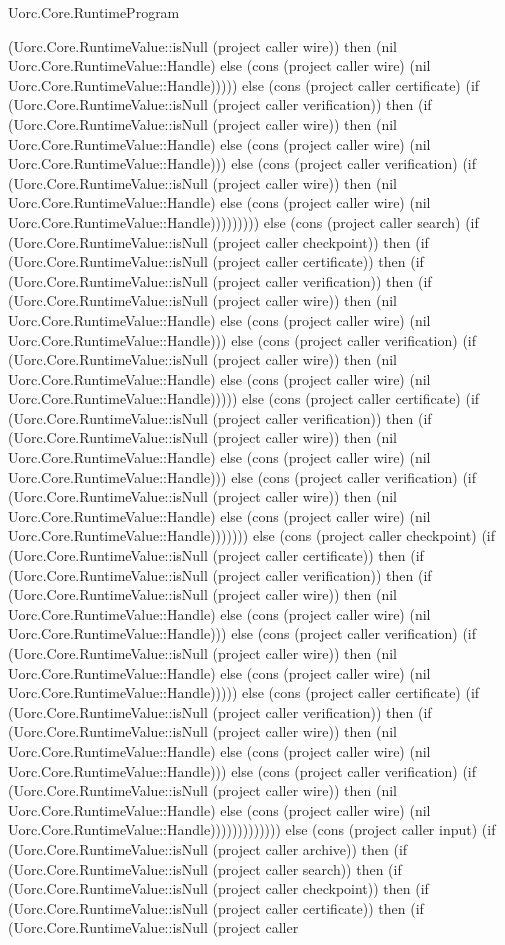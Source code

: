 \begin{lexlean}{Uorc.Core.RuntimeProgram}
\begin{semanticmodule}
{(Uorc.Core.RuntimeValue::isNull (project caller wire)) then (nil Uorc.Core.RuntimeValue::Handle) else (cons (project caller wire) (nil Uorc.Core.RuntimeValue::Handle))))) else (cons (project caller certificate) (if (Uorc.Core.RuntimeValue::isNull (project caller verification)) then (if (Uorc.Core.RuntimeValue::isNull (project caller wire)) then (nil Uorc.Core.RuntimeValue::Handle) else (cons (project caller wire) (nil Uorc.Core.RuntimeValue::Handle))) else (cons (project caller verification) (if (Uorc.Core.RuntimeValue::isNull (project caller wire)) then (nil Uorc.Core.RuntimeValue::Handle) else (cons (project caller wire) (nil Uorc.Core.RuntimeValue::Handle))))))))) else (cons (project caller search) (if (Uorc.Core.RuntimeValue::isNull (project caller checkpoint)) then (if (Uorc.Core.RuntimeValue::isNull (project caller certificate)) then (if (Uorc.Core.RuntimeValue::isNull (project caller verification)) then (if (Uorc.Core.RuntimeValue::isNull (project caller wire)) then (nil Uorc.Core.RuntimeValue::Handle) else (cons (project caller wire) (nil Uorc.Core.RuntimeValue::Handle))) else (cons (project caller verification) (if (Uorc.Core.RuntimeValue::isNull (project caller wire)) then (nil Uorc.Core.RuntimeValue::Handle) else (cons (project caller wire) (nil Uorc.Core.RuntimeValue::Handle))))) else (cons (project caller certificate) (if (Uorc.Core.RuntimeValue::isNull (project caller verification)) then (if (Uorc.Core.RuntimeValue::isNull (project caller wire)) then (nil Uorc.Core.RuntimeValue::Handle) else (cons (project caller wire) (nil Uorc.Core.RuntimeValue::Handle))) else (cons (project caller verification) (if (Uorc.Core.RuntimeValue::isNull (project caller wire)) then (nil Uorc.Core.RuntimeValue::Handle) else (cons (project caller wire) (nil Uorc.Core.RuntimeValue::Handle))))))) else (cons (project caller checkpoint) (if (Uorc.Core.RuntimeValue::isNull (project caller certificate)) then (if (Uorc.Core.RuntimeValue::isNull (project caller verification)) then (if (Uorc.Core.RuntimeValue::isNull (project caller wire)) then (nil Uorc.Core.RuntimeValue::Handle) else (cons (project caller wire) (nil Uorc.Core.RuntimeValue::Handle))) else (cons (project caller verification) (if (Uorc.Core.RuntimeValue::isNull (project caller wire)) then (nil Uorc.Core.RuntimeValue::Handle) else (cons (project caller wire) (nil Uorc.Core.RuntimeValue::Handle))))) else (cons (project caller certificate) (if (Uorc.Core.RuntimeValue::isNull (project caller verification)) then (if (Uorc.Core.RuntimeValue::isNull (project caller wire)) then (nil Uorc.Core.RuntimeValue::Handle) else (cons (project caller wire) (nil Uorc.Core.RuntimeValue::Handle))) else (cons (project caller verification) (if (Uorc.Core.RuntimeValue::isNull (project caller wire)) then (nil Uorc.Core.RuntimeValue::Handle) else (cons (project caller wire) (nil Uorc.Core.RuntimeValue::Handle))))))))))))) else (cons (project caller input) (if (Uorc.Core.RuntimeValue::isNull (project caller archive)) then (if (Uorc.Core.RuntimeValue::isNull (project caller search)) then (if (Uorc.Core.RuntimeValue::isNull (project caller checkpoint)) then (if (Uorc.Core.RuntimeValue::isNull (project caller certificate)) then (if (Uorc.Core.RuntimeValue::isNull (project caller }
\end{semanticmodule}
\end{lexlean}
